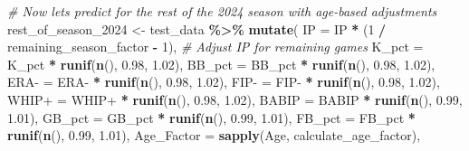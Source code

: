 \documentclass[
]{article}
\newenvironment{Shaded}{\begin{snugshade}}{\end{snugshade}}
\newcommand{\AttributeTok}[1]{\textcolor[rgb]{0.13,0.29,0.53}{#1}}
\newcommand{\CommentTok}[1]{\textcolor[rgb]{0.56,0.35,0.01}{\textit{#1}}}
\newcommand{\DecValTok}[1]{\textcolor[rgb]{0.00,0.00,0.81}{#1}}
\newcommand{\FloatTok}[1]{\textcolor[rgb]{0.00,0.00,0.81}{#1}}
\newcommand{\FunctionTok}[1]{\textcolor[rgb]{0.13,0.29,0.53}{\textbf{#1}}}
\newcommand{\NormalTok}[1]{#1}
\newcommand{\OtherTok}[1]{\textcolor[rgb]{0.56,0.35,0.01}{#1}}
\newcommand{\SpecialCharTok}[1]{\textcolor[rgb]{0.81,0.36,0.00}{\textbf{#1}}}
\newcommand{\StringTok}[1]{\textcolor[rgb]{0.31,0.60,0.02}{#1}}
\begin{document}
\begin{Shaded}
\begin{Highlighting}[]
\CommentTok{\# Now let\textquotesingle{}s predict for the rest of the 2024 season with age{-}based adjustments}
\NormalTok{rest\_of\_season\_2024 }\OtherTok{\textless{}{-}}\NormalTok{ test\_data }\SpecialCharTok{\%\textgreater{}\%}
  \FunctionTok{mutate}\NormalTok{(}
    \AttributeTok{IP =}\NormalTok{ IP }\SpecialCharTok{*}\NormalTok{ (}\DecValTok{1} \SpecialCharTok{/}\NormalTok{ remaining\_season\_factor }\SpecialCharTok{{-}} \DecValTok{1}\NormalTok{),  }\CommentTok{\# Adjust IP for remaining games}
    \AttributeTok{K\_pct =}\NormalTok{ K\_pct }\SpecialCharTok{*} \FunctionTok{runif}\NormalTok{(}\FunctionTok{n}\NormalTok{(), }\FloatTok{0.98}\NormalTok{, }\FloatTok{1.02}\NormalTok{),}
    \AttributeTok{BB\_pct =}\NormalTok{ BB\_pct }\SpecialCharTok{*} \FunctionTok{runif}\NormalTok{(}\FunctionTok{n}\NormalTok{(), }\FloatTok{0.98}\NormalTok{, }\FloatTok{1.02}\NormalTok{),}
    \StringTok{\textasciigrave{}}\AttributeTok{ERA{-}}\StringTok{\textasciigrave{}} \OtherTok{=} \StringTok{\textasciigrave{}}\AttributeTok{ERA{-}}\StringTok{\textasciigrave{}} \SpecialCharTok{*} \FunctionTok{runif}\NormalTok{(}\FunctionTok{n}\NormalTok{(), }\FloatTok{0.98}\NormalTok{, }\FloatTok{1.02}\NormalTok{),}
    \StringTok{\textasciigrave{}}\AttributeTok{FIP{-}}\StringTok{\textasciigrave{}} \OtherTok{=} \StringTok{\textasciigrave{}}\AttributeTok{FIP{-}}\StringTok{\textasciigrave{}} \SpecialCharTok{*} \FunctionTok{runif}\NormalTok{(}\FunctionTok{n}\NormalTok{(), }\FloatTok{0.98}\NormalTok{, }\FloatTok{1.02}\NormalTok{),}
    \StringTok{\textasciigrave{}}\AttributeTok{WHIP+}\StringTok{\textasciigrave{}} \OtherTok{=} \StringTok{\textasciigrave{}}\AttributeTok{WHIP+}\StringTok{\textasciigrave{}} \SpecialCharTok{*} \FunctionTok{runif}\NormalTok{(}\FunctionTok{n}\NormalTok{(), }\FloatTok{0.98}\NormalTok{, }\FloatTok{1.02}\NormalTok{),}
    \AttributeTok{BABIP =}\NormalTok{ BABIP }\SpecialCharTok{*} \FunctionTok{runif}\NormalTok{(}\FunctionTok{n}\NormalTok{(), }\FloatTok{0.99}\NormalTok{, }\FloatTok{1.01}\NormalTok{),}
    \AttributeTok{GB\_pct =}\NormalTok{ GB\_pct }\SpecialCharTok{*} \FunctionTok{runif}\NormalTok{(}\FunctionTok{n}\NormalTok{(), }\FloatTok{0.99}\NormalTok{, }\FloatTok{1.01}\NormalTok{),}
    \AttributeTok{FB\_pct =}\NormalTok{ FB\_pct }\SpecialCharTok{*} \FunctionTok{runif}\NormalTok{(}\FunctionTok{n}\NormalTok{(), }\FloatTok{0.99}\NormalTok{, }\FloatTok{1.01}\NormalTok{),}
    \AttributeTok{Age\_Factor =} \FunctionTok{sapply}\NormalTok{(Age, calculate\_age\_factor),}

\end{Highlighting}
\end{Shaded}
\end{document}
